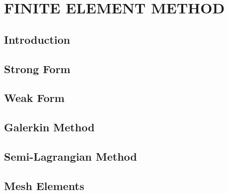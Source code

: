 \chapter{\textbf{FINITE ELEMENT METHOD}}
\label{metodo dos elementos finitos}

\section{\textbf{Introduction}} 


\section{\textbf{Strong Form}} 
\label{formulacao forte}



\section{\textbf{Weak Form}} 
\label{formulacao fraca}



\section{\textbf{Galerkin Method}} 
\label{discretizacao espaco}



\section{\textbf{Semi-Lagrangian Method}} 
\label{discretizacao tempo}



\section{\textbf{Mesh Elements}} 
\label{elemento}





